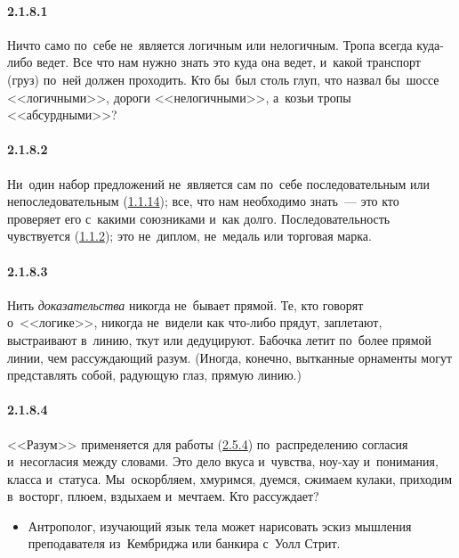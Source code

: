 \paragraph{2.1.8.1}\hypertarget{par:2.1.8.1}{} Ничто само по~себе не~является логичным или нелогичным. Тропа всегда куда-либо ведет. Все что нам нужно знать это куда она ведет, и~какой транспорт (груз) по~ней должен проходить. Кто бы~был столь глуп, что назвал бы~шоссе <<логичными>>, дороги <<нелогичными>>, а~козьи тропы <<абсурдными>>?

\paragraph{2.1.8.2}\hypertarget{par:2.1.8.2}{} Ни~один набор предложений не~является сам по~себе последовательным или непоследовательным (\hyperlink{par:1.1.14}{1.1.14}); все, что нам необходимо знать~--- это кто проверяет его с~какими союзниками и~как долго. Последовательность чувствуется (\hyperlink{par:1.1.2}{1.1.2}); это не~диплом, не~медаль или торговая марка.

\paragraph{2.1.8.3}\hypertarget{par:2.1.8.3}{} Нить {\itshape доказательства} никогда не~бывает прямой. Те, кто говорят о~<<логике>>, никогда не~видели как что-либо прядут, заплетают, выстраивают в~линию, ткут или дедуцируют. Бабочка летит по~более прямой линии, чем рассуждающий разум. (Иногда, конечно, вытканные орнаменты могут представлять собой, радующую глаз, прямую
линию.)

\paragraph{2.1.8.4}\hypertarget{par:2.1.8.4}{} <<Разум>> применяется для работы (\hyperlink{par:2.5.4}{2.5.4}) по~распределению согласия и~несогласия между словами. Это дело вкуса и~чувства, ноу-хау и~понимания, класса и~статуса. Мы~оскорбляем, хмуримся, дуемся, сжимаем кулаки, приходим в~восторг, плюем, вздыхаем и~мечтаем. Кто рассуждает?
	\begin{itemize}
	\item 
	Антрополог, изучающий язык тела может нарисовать эскиз мышления преподавателя из~Кембриджа или банкира с~Уолл Стрит.
	\end{itemize}

